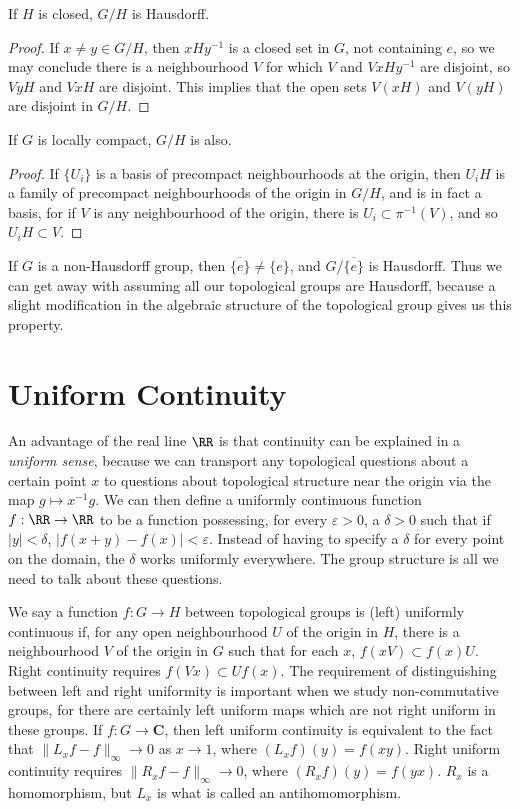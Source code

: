 \begin{theorem}
    If $H$ is closed, $G/H$ is Hausdorff.
\end{theorem}
\begin{proof}
    If $x \neq y \in G/H$, then $xHy^{-1}$ is a closed set in $G$, not containing $e$, so we may conclude there is a neighbourhood $V$ for which $V$ and $VxHy^{-1}$ are disjoint, so $VyH$ and $VxH$ are disjoint. This implies that the open sets $V(xH)$ and $V(yH)$ are disjoint in $G/H$.
\end{proof}

\begin{theorem}
    If $G$ is locally compact, $G/H$ is also.
\end{theorem}
\begin{proof}
    If $\{ U_i \}$ is a basis of precompact neighbourhoods at the origin, then $U_iH$ is a family of precompact neighbourhoods of the origin in $G/H$, and is in fact a basis, for if $V$ is any neighbourhood of the origin, there is $U_i \subset \pi^{-1}(V)$, and so $U_iH \subset V$.
\end{proof}

If $G$ is a non-Hausdorff group, then $\overline{\{e\}} \neq \{ e \}$, and $G/\overline{\{e\}}$ is Hausdorff. Thus we can get away with assuming all our topological groups are Hausdorff, because a slight modification in the algebraic structure of the topological group gives us this property.

\section{Uniform Continuity}

An advantage of the real line $\RR$ is that continuity can be explained in a {\it uniform sense}, because we can transport any topological questions about a certain point $x$ to questions about topological structure near the origin via the map $g \mapsto x^{-1}g$. We can then define a uniformly continuous function $f: \RR \to \RR$ to be a function possessing, for every $\varepsilon > 0$, a $\delta > 0$ such that if $|y| < \delta$, $|f(x+y) - f(x)|<\varepsilon$. Instead of having to specify a $\delta$ for every point on the domain, the $\delta$ works uniformly everywhere. The group structure is all we need to talk about these questions.

We say a function $f: G \to H$ between topological groups is (left) uniformly continuous if, for any open neighbourhood $U$ of the origin in $H$, there is a neighbourhood $V$ of the origin in $G$ such that for each $x$, $f(xV) \subset f(x) U$. Right continuity requires $f(Vx) \subset U f(x)$. The requirement of distinguishing between left and right uniformity is important when we study non-commutative groups, for there are certainly left uniform maps which are not right uniform in these groups. If $f: G \to \mathbf{C}$, then left uniform continuity is equivalent to the fact that $\| L_x f - f \|_\infty \to 0$ as $x \to 1$, where $(L_x f)(y) = f(xy)$. Right uniform continuity requires $\| R_x f - f \|_\infty \to 0$, where $(R_x f)(y) = f(yx)$. $R_x$ is a homomorphism, but $L_x$ is what is called an antihomomorphism.

